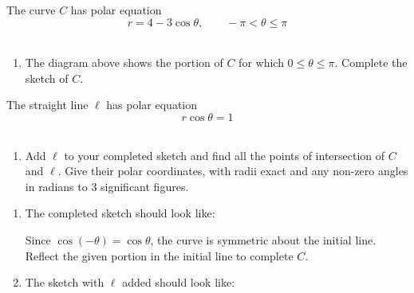 \documentclass[leqno]{article}
\begin{document}
\begin{enumerate}[
  label=\textbf{\arabic*.},
  leftmargin=*,
  topsep=0pt,
  partopsep=0pt,
  parsep=0pt
]
The curve $C$ has polar equation
\[
r=4-3\cos\theta,\qquad -\pi<\theta\leq\pi
\] \\
\begin{enumerate}[label=\textbf{(\alph*)}]
\item The diagram above shows the portion of $C$ for which $0\leq\theta\leq\pi$. Complete the sketch of $C$.  \\
\end{enumerate}
The straight line $\ell$ has polar equation
\[
r\cos\theta=1
\] \\
\begin{enumerate}[label=\textbf{(\alph*)}, resume]
\item Add $\ell$ to your completed sketch and find all the points of intersection of $C$ and $\ell$. Give their polar coordinates, with radii exact and any non-zero angles in radians to $3$ significant figures.  \\
\end{enumerate}

\vspace*{10pt}

\begin{djsSolution}
\begin{enumerate}[label=\textbf{(\alph*)}, start=1]
\item
The completed sketch should look like:\par\nopagebreak


Since \(\cos(-\theta)=\cos\theta\), the curve is symmetric about the initial line. Reflect the given portion in the initial line to complete \(C\).

\item The sketch with \(\ell\) added should look like:\par\nopagebreak


\end{enumerate}
\end{djsSolution}
\end{enumerate}
\end{document}
